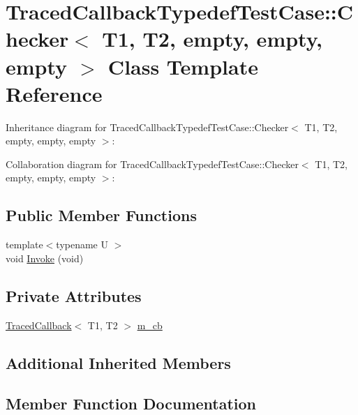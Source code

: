 \hypertarget{classTracedCallbackTypedefTestCase_1_1Checker_3_01T1_00_01T2_00_01empty_00_01empty_00_01empty_01_4}{}\section{Traced\+Callback\+Typedef\+Test\+Case\+:\+:Checker$<$ T1, T2, empty, empty, empty $>$ Class Template Reference}
\label{classTracedCallbackTypedefTestCase_1_1Checker_3_01T1_00_01T2_00_01empty_00_01empty_00_01empty_01_4}


Inheritance diagram for Traced\+Callback\+Typedef\+Test\+Case\+:\+:Checker$<$ T1, T2, empty, empty, empty $>$\+:


Collaboration diagram for Traced\+Callback\+Typedef\+Test\+Case\+:\+:Checker$<$ T1, T2, empty, empty, empty $>$\+:
\subsection*{Public Member Functions}
\begin{DoxyCompactItemize}
\item 
{\footnotesize template$<$typename U $>$ }\\void \hyperlink{classTracedCallbackTypedefTestCase_1_1Checker_3_01T1_00_01T2_00_01empty_00_01empty_00_01empty_01_4_a3411001619fa0e25c51fa95cc6bbe378}{Invoke} (void)
\end{DoxyCompactItemize}
\subsection*{Private Attributes}
\begin{DoxyCompactItemize}
\item 
\hyperlink{classns3_1_1TracedCallback}{Traced\+Callback}$<$ T1, T2 $>$ \hyperlink{classTracedCallbackTypedefTestCase_1_1Checker_3_01T1_00_01T2_00_01empty_00_01empty_00_01empty_01_4_a63fe47f1639c63a9e6b9d776a4befc65}{m\+\_\+cb}
\end{DoxyCompactItemize}
\subsection*{Additional Inherited Members}


\subsection{Member Function Documentation}
